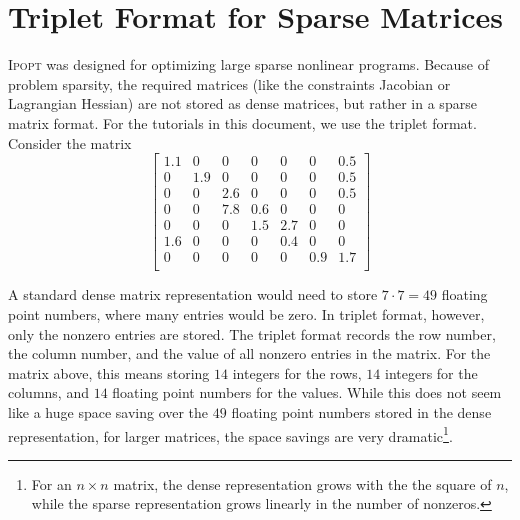\documentclass[10pt]{article}
\newcommand{\Ipopt}{\textsc{Ipopt}\xspace}
\begin{document}
\appendix
\section{Triplet Format for Sparse Matrices}\label{app.triplet}
\Ipopt was designed for optimizing large sparse nonlinear programs.
Because of problem sparsity, the required matrices (like the
constraints Jacobian or Lagrangian Hessian) are not stored as dense
matrices, but rather in a sparse matrix format. For the tutorials in
this document, we use the triplet format.  Consider the matrix
\begin{equation}
\label{eqn.ex_matrix}
\left[
\begin{array}{ccccccc}
1.1     & 0             & 0             & 0             & 0             & 0             & 0.5 \\
0       & 1.9   & 0             & 0             & 0             & 0             & 0.5 \\
0       & 0             & 2.6   & 0             & 0             & 0             & 0.5 \\
0       & 0             & 7.8   & 0.6   & 0             & 0             & 0    \\
0       & 0             & 0             & 1.5   & 2.7   & 0             & 0     \\
1.6     & 0             & 0             & 0             & 0.4   & 0             & 0     \\
0       & 0             & 0             & 0             & 0             & 0.9   & 1.7 \\
\end{array}
\right]
\end{equation}

A standard dense matrix representation would need to store $7 \cdot
7{=} 49$ floating point numbers, where many entries would be zero. In
triplet format, however, only the nonzero entries are stored. The
triplet format records the row number, the column number, and the
value of all nonzero entries in the matrix. For the matrix above, this
means storing $14$ integers for the rows, $14$ integers for the
columns, and $14$ floating point numbers for the values. While this
does not seem like a huge space saving over the $49$ floating point
numbers stored in the dense representation, for larger matrices, the
space savings are very dramatic\footnote{For an $n \times n$ matrix,
the dense representation grows with the the square of $n$, while the
sparse representation grows linearly in the number of nonzeros.}.
\end{document}
